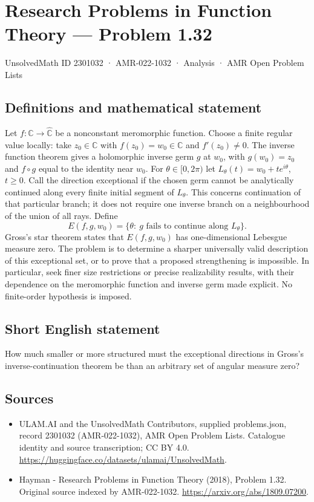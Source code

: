 \documentclass[11pt,a4paper]{article}
\begin{document}
\section*{Research Problems in Function Theory — Problem 1.32}\label{2301032}
{\small UnsolvedMath ID 2301032 · AMR-022-1032 · Analysis · AMR Open Problem Lists}
\subsection{Definitions and mathematical statement}
Let $f:\mathbb C\to\widehat{\mathbb C}$ be a nonconstant meromorphic function. Choose a finite regular value locally: take $z_0\in\mathbb C$ with $f(z_0)=w_0\in\mathbb C$ and $f'(z_0)\ne0$. The inverse function theorem gives a holomorphic inverse germ $g$ at $w_0$, with $g(w_0)=z_0$ and $f\circ g$ equal to the identity near $w_0$.
For $\theta\in[0,2\pi)$ let $L_\theta(t)=w_0+te^{i\theta}$, $t\ge0$. Call the direction exceptional if the chosen germ cannot be analytically continued along every finite initial segment of $L_\theta$. This concerns continuation of that particular branch; it does not require one inverse branch on a neighbourhood of the union of all rays. Define
\[
E(f,g,w_0)=\{\theta:\ g\text{ fails to continue along }L_\theta\}.
\]
Gross's star theorem states that $E(f,g,w_0)$ has one-dimensional Lebesgue measure zero. The problem is to determine a sharper universally valid description of this exceptional set, or to prove that a proposed strengthening is impossible. In particular, seek finer size restrictions or precise realizability results, with their dependence on the meromorphic function and inverse germ made explicit. No finite-order hypothesis is imposed.
\subsection{Short English statement}
How much smaller or more structured must the exceptional directions in Gross's inverse-continuation theorem be than an arbitrary set of angular measure zero?
\subsection{Sources}
\begin{itemize}
\item[S1] ULAM.AI and the UnsolvedMath Contributors, supplied problems.json, record 2301032 (AMR-022-1032), AMR Open Problem Lists. Catalogue identity and source transcription; CC BY 4.0.
\url{https://huggingface.co/datasets/ulamai/UnsolvedMath}.
\item[S2] Hayman - Research Problems in Function Theory (2018), Problem 1.32. Original source indexed by AMR-022-1032.
\url{https://arxiv.org/abs/1809.07200}.
\end{itemize}
\end{document}
